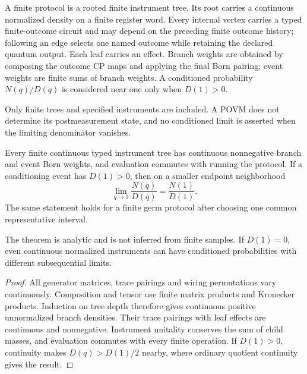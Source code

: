 \begin{definition}
A finite protocol is a rooted finite instrument tree.  Its root carries a
continuous normalized density on a finite register word.  Every internal
vertex carries a typed finite-outcome circuit and may depend on the preceding
finite outcome history; following an edge selects one named outcome while
retaining the declared quantum output.  Each leaf carries an effect.  Branch
weights are obtained by composing the outcome CP maps and applying the final
Born pairing; event weights are finite sums of branch weights.  A conditioned
probability $N(q)/D(q)$ is considered near one only when $D(1)>0$.
\end{definition}
\begin{scope}
Only finite trees and specified instruments are included.  A POVM does not
determine its postmeasurement state, and no conditioned limit is asserted
when the limiting denominator vanishes.
\end{scope}

\begin{theorem}
{\normalfont\statusProved}\quad
Every finite continuous typed instrument tree has continuous nonnegative
branch and event Born weights, and evaluation commutes with running the
protocol.  If a conditioning event has $D(1)>0$, then on a smaller endpoint
neighborhood
\[
 \lim_{q\to1}\frac{N(q)}{D(q)}=\frac{N(1)}{D(1)}.
\]
The same statement holds for a finite germ protocol after choosing one
common representative interval.
\end{theorem}
\begin{scope}
The theorem is analytic and is not inferred from finite samples.  If
$D(1)=0$, even continuous normalized instruments can have conditioned
probabilities with different subsequential limits.
\end{scope}
\begin{proof}
All generator matrices, trace pairings and wiring permutations vary
continuously.  Composition and tensor use finite matrix products and
Kronecker products.  Induction on tree depth therefore gives continuous
positive unnormalized branch densities.  Their trace pairings with leaf
effects are continuous and nonnegative.  Instrument unitality conserves the
sum of child masses, and evaluation commutes with every finite operation.
If $D(1)>0$, continuity makes $D(q)>D(1)/2$ nearby, where ordinary quotient
continuity gives the result.
\end{proof}

